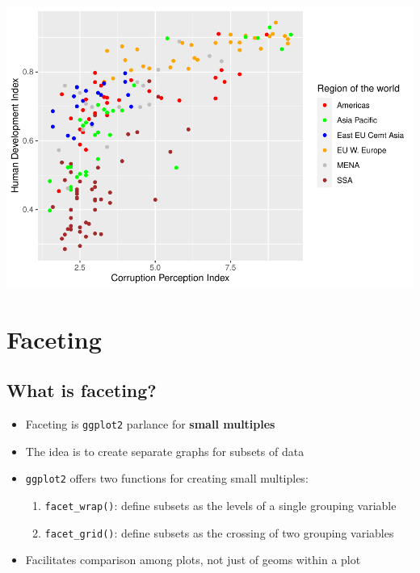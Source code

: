 \documentclass[
]{book}
\providecommand{\tightlist}{%
  \setlength{\itemsep}{0pt}\setlength{\parskip}{0pt}}
\begin{document}
\begin{alert}
\includegraphics{R/Rgraphics/figures/unnamed-chunk-192-1.pdf}

\end{alert}

\hypertarget{faceting}{%
\section{Faceting}\label{faceting}}

\hypertarget{what-is-faceting}{%
\subsection{What is faceting?}\label{what-is-faceting}}

\begin{itemize}
\tightlist
\item
  Faceting is \texttt{ggplot2} parlance for \textbf{small multiples}
\item
  The idea is to create separate graphs for subsets of data
\item
  \texttt{ggplot2} offers two functions for creating small multiples:

  \begin{enumerate}
  \def\labelenumi{\arabic{enumi}.}
  \tightlist
  \item
    \texttt{facet\_wrap()}: define subsets as the levels of a single grouping variable
  \item
    \texttt{facet\_grid()}: define subsets as the crossing of two grouping variables
  \end{enumerate}
\item
  Facilitates comparison among plots, not just of geoms within a plot
\end{itemize}
\end{document}
